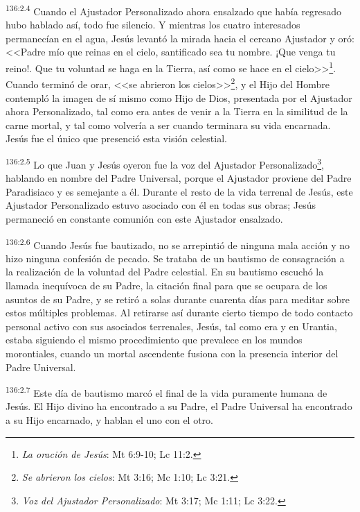 \par 
\textsuperscript{136:2.4} Cuando el Ajustador Personalizado ahora ensalzado que había regresado hubo hablado así, todo fue silencio. Y mientras los cuatro interesados permanecían en el agua, Jesús levantó la mirada hacia el cercano Ajustador y oró: <<Padre mío que reinas en el cielo, santificado sea tu nombre. ¡Que venga tu reino!. Que tu voluntad se haga en la Tierra, así como se hace en el cielo>>\footnote{\textit{La oración de Jesús}: Mt 6:9-10; Lc 11:2.}. Cuando terminó de orar, <<se abrieron los cielos>>\footnote{\textit{Se abrieron los cielos}: Mt 3:16; Mc 1:10; Lc 3:21.}, y el Hijo del Hombre contempló la imagen de sí mismo como Hijo de Dios, presentada por el Ajustador ahora Personalizado, tal como era antes de venir a la Tierra en la similitud de la carne mortal, y tal como volvería a ser cuando terminara su vida encarnada. Jesús fue el único que presenció esta visión celestial.

\par 
\textsuperscript{136:2.5} Lo que Juan y Jesús oyeron fue la voz del Ajustador Personalizado\footnote{\textit{Voz del Ajustador Personalizado}: Mt 3:17; Mc 1:11; Lc 3:22.}, hablando en nombre del Padre Universal, porque el Ajustador proviene del Padre Paradisiaco y es semejante a él. Durante el resto de la vida terrenal de Jesús, este Ajustador Personalizado estuvo asociado con él en todas sus obras; Jesús permaneció en constante comunión con este Ajustador ensalzado.

\par 
\textsuperscript{136:2.6} Cuando Jesús fue bautizado, no se arrepintió de ninguna mala acción y no hizo ninguna confesión de pecado. Se trataba de un bautismo de consagración a la realización de la voluntad del Padre celestial. En su bautismo escuchó la llamada inequívoca de su Padre, la citación final para que se ocupara de los asuntos de su Padre, y se retiró a solas durante cuarenta días para meditar sobre estos múltiples problemas. Al retirarse así durante cierto tiempo de todo contacto personal activo con sus asociados terrenales, Jesús, tal como era y en Urantia, estaba siguiendo el mismo procedimiento que prevalece en los mundos morontiales, cuando un mortal ascendente fusiona con la presencia interior del Padre Universal.

\par 
\textsuperscript{136:2.7} Este día de bautismo marcó el final de la vida puramente humana de Jesús. El Hijo divino ha encontrado a su Padre, el Padre Universal ha encontrado a su Hijo encarnado, y hablan el uno con el otro.

